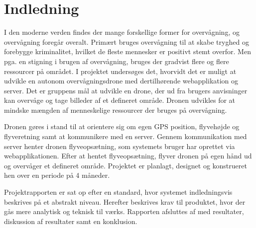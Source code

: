 \chapter{Indledning}
\label{chap:indledning}

I den moderne verden findes der mange forskellige former for overvågning, og overvågning foregår overalt. Primært bruges overvågning til at skabe tryghed og forebygge kriminalitet, hvilket de fleste mennesker er positivt stemt overfor. Men pga. en stigning i brugen af overvågning, bruges der gradvist flere og flere ressourcer på området. 
I projektet undersøges det, hvorvidt det er muligt at udvikle en autonom overvågningsdrone med dertilhørende webapplikation og server. Det er gruppens mål at udvikle en drone, der ud fra brugers anvisninger kan overvåge og tage billeder af et defineret område. Dronen udvikles for at mindske mængden af menneskelige ressourcer der bruges på overvågning.

Dronen gøres i stand til at orientere sig om egen GPS position, flyvehøjde og flyveretning samt at kommunikere med en server. Gennem kommunikation med server henter dronen flyveopsætning, som systemets bruger har oprettet via webapplikationen.
Efter at hentet flyveopsætning, flyver dronen på egen hånd ud og overvåger et defineret område. Projektet er planlagt, designet og konstrueret hen over en periode på 4 måneder.

Projektrapporten er sat op efter en standard, hvor systemet indledningsvis beskrives på et abstrakt niveau. Herefter beskrives krav til produktet, hvor der gås mere analytisk og teknisk til værks. Rapporten afsluttes af med resultater, diskussion af resultater samt en konklusion.


